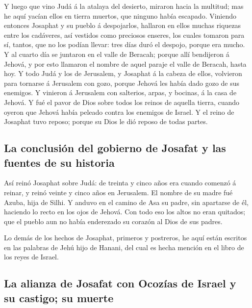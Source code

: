  Y luego que vino Judá á la atalaya del desierto, miraron
hacia la multitud; mas he aquí yacían ellos en tierra muertos, que
ninguno había escapado.  Viniendo entonces Josaphat y su
pueblo á despojarlos, hallaron en ellos muchas riquezas entre los
cadáveres, así vestidos como preciosos enseres, los cuales tomaron para
sí, tantos, que no los podían llevar: tres días duró el despojo, porque
era mucho.  Y al cuarto día se juntaron en el valle de
Beracah; porque allí bendijeron á Jehová, y por esto llamaron el nombre
de aquel paraje el valle de Beracah, hasta hoy.  Y todo
Judá y los de Jerusalem, y Josaphat á la cabeza de ellos, volvieron para
tornarse á Jerusalem con gozo, porque Jehová les había dado gozo de sus
enemigos.  Y vinieron á Jerusalem con salterios, arpas, y
bocinas, á la casa de Jehová.  Y fué el pavor de Dios sobre
todos los reinos de aquella tierra, cuando oyeron que Jehová había
peleado contra los enemigos de Israel.  Y el reino de
Josaphat tuvo reposo; porque su Dios le dió reposo de todas partes.

\hypertarget{la-conclusiuxf3n-del-gobierno-de-josafat-y-las-fuentes-de-su-historia}{%
\subsection{La conclusión del gobierno de Josafat y las fuentes de su
historia}\label{la-conclusiuxf3n-del-gobierno-de-josafat-y-las-fuentes-de-su-historia}}

 Así reinó Josaphat sobre Judá: de treinta y cinco años era
cuando comenzó á reinar, y reinó veinte y cinco años en Jerusalem. El
nombre de su madre fué Azuba, hija de Silhi.  Y anduvo en
el camino de Asa su padre, sin apartarse de él, haciendo lo recto en los
ojos de Jehová.  Con todo eso los altos no eran quitados;
que el pueblo aun no había enderezado su corazón al Dios de sus padres.

 Lo demás de los hechos de Josaphat, primeros y postreros,
he aquí están escritos en las palabras de Jehú hijo de Hanani, del cual
es hecha mención en el libro de los reyes de Israel.

\hypertarget{la-alianza-de-josafat-con-ocozuxedas-de-israel-y-su-castigo-su-muerte}{%
\subsection{La alianza de Josafat con Ocozías de Israel y su castigo; su
muerte}\label{la-alianza-de-josafat-con-ocozuxedas-de-israel-y-su-castigo-su-muerte}}

